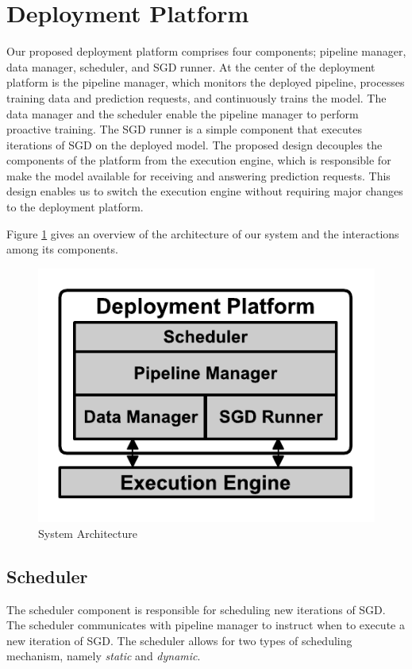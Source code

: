 \section{Deployment Platform} \label{sec:system-architecture}
Our proposed deployment platform comprises four components; pipeline manager, data manager, scheduler, and SGD runner.
At the center of the deployment platform is the pipeline manager, which monitors the deployed pipeline, processes training data and prediction requests, and continuously trains the model.
The data manager and the scheduler enable the pipeline manager to perform proactive training.
The SGD runner is a simple component that executes iterations of SGD on the deployed model.
The proposed design decouples the components of the platform from the execution engine, which is responsible for make the model available for receiving and answering prediction requests.
This design enables us to switch the execution engine without requiring major changes to the deployment platform.

Figure \ref{fig:system-architecture} gives an overview of the architecture of our system and the interactions among its components.

\begin{figure}[t]
\centering
\includegraphics[width=\columnwidth]{../images/system-architecture.pdf}
\caption{System Architecture}
\label{fig:system-architecture}
\end{figure}

\subsection{Scheduler}\label{scheduler}
The scheduler component is responsible for scheduling new iterations of SGD.
The scheduler communicates with pipeline manager to instruct when to execute a new iteration of SGD.
The scheduler allows for two types of scheduling mechanism, namely \textit{static} and \textit{dynamic}.

